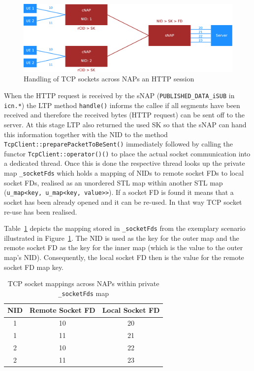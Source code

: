 \documentclass[a4paper,11pt,titlepage]{report}
\begin{document}
\begin{figure}[htb]
\centering
\includegraphics[width=1\linewidth]{eps/tcpSocketMappings}
\caption{Handling of TCP sockets across \aclp{NAP} an HTTP session}
\label{fig:TCP_Socket_Mappings}
\end{figure}

When the HTTP request is received by the \ac{sNAP} (\texttt{PUBLISHED\_DATA\_iSUB} in \texttt{icn.*}) the \ac{LTP} method \texttt{handle()} informs the callee if all segments have been received and therefore the received bytes (HTTP request) can be sent off to the server. At this stage \ac{LTP} also returned the used \ac{SK} so that the \ac{sNAP} can hand this information together with the \ac{NID} to the method \texttt{TcpClient::preparePacketToBeSent()} immediately followed by calling the functor \texttt{TcpClient::operator()()} to place the actual socket communication into a dedicated thread. Once this is done the respective thread looks up the private map \texttt{\_socketFds} which holds a mapping of \acp{NID} to remote socket \acp{FD} to local socket \acp{FD}, realised as an unordered \ac{STL} map within another \ac{STL} map (\texttt{u\_map<key, u\_map<key, value>>}). If a socket \ac{FD} is found it means that a socket has been already opened and it can be re-used. In that way \ac{TCP} socket re-use has been realised.

Table~\ref{tab:TCP_Socket_Mappings_sNAP_Request} depicts the mapping stored in \texttt{\_socketFds} from the exemplary scenario illustrated in Figure~\ref{fig:TCP_Socket_Mappings}. The \ac{NID} is used as the key for the outer map and the remote socket \ac{FD} as the key for the inner map (which is the value to the outer map's \ac{NID}). Consequently, the local socket \ac{FD} then is the value for the remote socket \ac{FD} map key.

\begin{table}[t]
	\centering
	\caption[TCP socket mappings across NAPs]{TCP socket mappings across \aclp{NAP} within private \texttt{\_socketFds} map}	\label{tab:TCP_Socket_Mappings_sNAP_Request}
\begin{tabular}{|c|c|c|}
	\hline \textbf{\ac{NID}} & \textbf{Remote Socket \ac{FD}} & \textbf{Local Socket \ac{FD}} \\ 
	\hline 1 & 10 & 20 \\ 
	\hline 1 & 11 & 21 \\ 
	\hline 2 & 10 & 22 \\ 
	\hline 2 & 11 & 23 \\ 
	\hline 
\end{tabular}
\end{table} 
\end{document}
